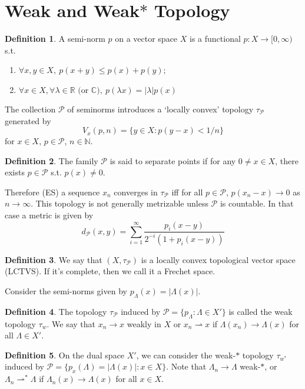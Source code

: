 \documentclass{article}
\theoremstyle{definition}
\newtheorem{defn}{Definition}[section]
\theoremstyle{remark}
\theoremstyle{plain}
\newcommand{\NN}{\mathbb{N}}
\newcommand{\RR}{\mathbb{R}}
\newcommand{\CC}{\mathbb{C}}
\begin{document}
\section{Weak and Weak\(*\) Topology}
\begin{defn}
    A semi-norm $p$ on a vector space $X$ is a functional $p:X\to[0,\infty)$ s.t.\begin{enumerate}[1)]
        \item $\forall x,y\in X, \ p(x+y)\le p(x)+p(y)$;
        \item $\forall x\in X,\forall \lambda\in \RR \text{ (or $\CC$)},\ p(\lambda x)=|\lambda|p(x)$
    \end{enumerate}
\end{defn}
The collection $\mathcal P$ of seminorms introduces a `locally convex' topology $\tau_{\mathcal P}$ generated by
$$V_x(p,n)=\{y\in X: p(y-x)<1/n\}$$
for $x\in X$, $p\in \mathcal P$, $n\in\NN$.
\begin{defn}
    The family $\mathcal P$ is said to separate points if for any $0\neq x\in X$, there exists $p\in \mathcal P$ s.t. $p(x)\neq 0$.
\end{defn}
Therefore (ES) a sequence $x_n$ converges in $\tau_\mathcal P$ iff for all $p\in \mathcal P$, $p(x_n-x)\to 0$ as $n\to\infty$. This topology is not generally metrizable unless $\mathcal P$ is countable. In that case a metric is given by
\[d_{\mathcal P}(x,y)=\sum_{i=1}^\infty\dfrac{p_i(x-y)}{2^{-i}(1+p_i(x-y))}\]
\begin{defn}
    We say that $(X,\tau_{\mathcal P})$ is a locally convex topological vector space (LCTVS). If it's complete, then we call it a Frechet space.
\end{defn}
Consider the semi-norms given by $p_\Lambda(x)=|\Lambda(x)|$.
\begin{defn}
    The topology $\tau_{\mathcal P}$ induced by $\mathcal P=\{p_\Lambda:\Lambda\in X'\}$ is called the weak topology $\tau_w$. We say that $x_n\to x$ weakly in $X$ or $x_n\rightharpoonup x$ if $\Lambda(x_n)\to \Lambda(x)$ for all $\Lambda\in X'$.
\end{defn}
\begin{defn}
    On the dual space $X'$, we can consider the weak-$\ast$ topology $\tau_{w^\ast}$ induced by $\mathcal P=\{p_x(\Lambda)=|\Lambda(x)|:x\in X\}$. Note that $\Lambda_n\to\Lambda$ weak-$\ast$, or $\Lambda_n\rightharpoonup^\ast\Lambda$ if $\Lambda_n(x)\to\Lambda(x)$ for all $x\in X$.
\end{defn}
\end{document}
